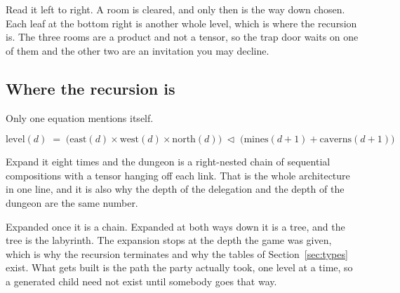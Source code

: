 \documentclass[11pt,a4paper]{article}
\begin{document}
\begin{center}
\end{center}

Read it left to right. A room is cleared, and only then is the way down chosen. Each leaf at
the bottom right is another whole level, which is where the recursion is. The three rooms are a
product and not a tensor, so the trap door waits on one of them and the other two are an
invitation you may decline.

\subsection{Where the recursion is}
\label{sec:recursion}

Only one equation mentions itself.

\[ \text{level}(d) \;=\; \bigl( \text{east}(d) \times \text{west}(d) \times \text{north}(d) \bigr) \;\lhd\; \bigl( \text{mines}(d{+}1) + \text{caverns}(d{+}1) \bigr) \]

Expand it eight times and the dungeon is a right-nested chain of sequential compositions with a
tensor hanging off each link. That is the whole architecture in one line, and it is also why the
depth of the delegation and the depth of the dungeon are the same number.

Expanded once it is a chain. Expanded at both ways down it is a tree, and the tree is the
labyrinth. The expansion stops at the depth the game was given, which is why the recursion
terminates and why the tables of Section~\ref{sec:types} exist. What gets built is the path the
party actually took, one level at a time, so a generated child need not exist until somebody
goes that way.
\end{document}
